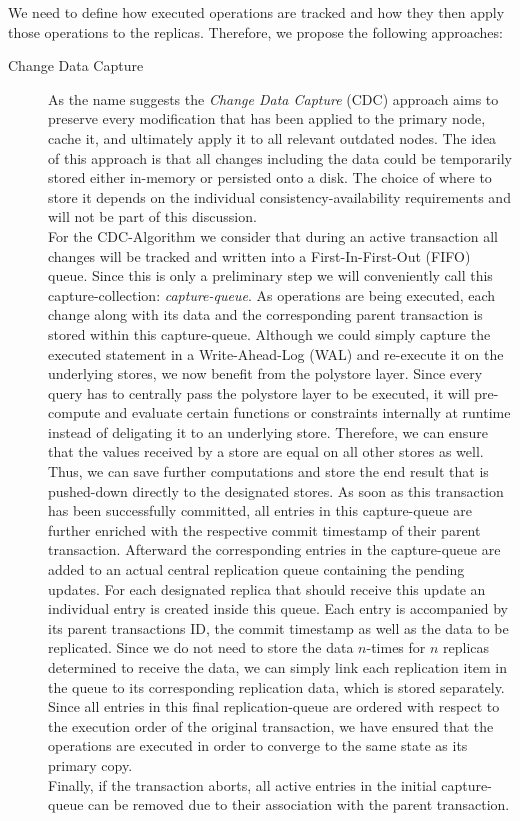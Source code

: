 We need to define how executed operations are tracked and how they then apply those operations to the replicas. 
Therefore, we propose the following approaches: \\

\begin{description}
    \item [Change Data Capture]
     As the name suggests the \emph{Change Data Capture} (CDC) approach aims to preserve every modification that has been applied to the primary node, cache it, and ultimately
    apply it to all relevant outdated nodes. 
    The idea of this approach is that all changes including the data could be temporarily stored either in-memory or persisted onto a disk.
    The choice of where to store it depends on the individual consistency-availability requirements and will not be part of this discussion.\\
    For the CDC-Algorithm we consider that during an active transaction all changes will be tracked and written into a First-In-First-Out (FIFO) queue.
    Since this is only a preliminary step we will conveniently call this capture-collection: \emph{capture-queue}.
    As operations are being executed, each change along with its data and the corresponding parent transaction is stored within this capture-queue.
    Although we could simply capture the executed statement in a Write-Ahead-Log (WAL) and re-execute it on the underlying stores, we now benefit from the polystore layer.
    Since every query has to centrally pass the polystore layer to be executed, it will pre-compute and evaluate certain functions or constraints internally at runtime instead of
    deligating it to an underlying store. Therefore, we can ensure that the values received by a store are equal on all other stores as well.
    Thus, we can save further computations and store the end result that is pushed-down directly
    to the designated stores. As soon as this transaction has been successfully committed, all entries in this capture-queue are further enriched with the respective commit timestamp of their parent transaction.
    Afterward the corresponding entries in the capture-queue are added to an actual central replication queue containing the pending updates.
    For each designated replica that should receive this update an individual entry is created inside this queue. 
    Each entry is accompanied by its parent transactions ID, the commit timestamp as well as the data to be replicated.
    Since we do not need to store the data $n$-times for $n$ replicas determined to receive the data, we can simply link each replication item in the queue to its 
    corresponding replication data, which is stored separately. 
    Since all entries in this final replication-queue are ordered with respect to the execution order of the original transaction,
    we have ensured that the operations are executed in order to converge to the same state as its primary copy.\\ 
    Finally, if the transaction aborts, all active entries in the initial capture-queue can be removed due to their association with the parent transaction.\\




\end{description}
